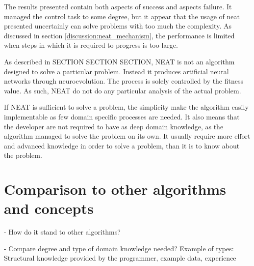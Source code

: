 The results presented contain both aspects of success and aspects failure. It managed the control task to some degree, but it appear that the usage of neat presented uncertainly can solve problems with too much the complexity. As discussed in section \ref{discussion:neat_mechanism}, the performance is limited when steps in which it is required to progress is too large.

As described in SECTION SECTION SECTION, NEAT is not an algorithm designed to solve a particular problem. Instead it produces artificial neural networks through neuroevolution. The process is solely controlled by the fitness value. As such, NEAT do not do any particular analysis of the actual problem. 

If NEAT is sufficient to solve a problem, the simplicity make the algorithm easily implementable as few domain specific processes are needed. It also means that the developer are not required to have as deep domain knowledge, as the algorithm managed to solve the problem on its own. It usually require more effort and advanced knowledge in order to solve a problem, than it is to know about the problem.



\section{Comparison to other algorithms and concepts}
- How do it stand to other algorithms?

- Compare degree and type of domain knowledge needed? Example of types: Structural knowledge provided by the programmer, example data, experience



